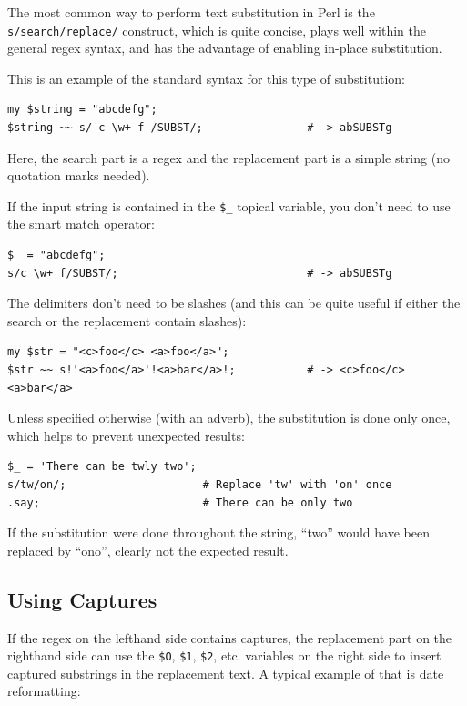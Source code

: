 The most common way to perform text substitution 
in Perl is the \verb's/search/replace/' construct, which 
is quite concise, plays well within the general regex syntax, 
and has the advantage of enabling in-place substitution.

This is an example of the standard syntax for this type 
of substitution:

\begin{verbatim}
my $string = "abcdefg";
$string ~~ s/ c \w+ f /SUBST/;                # -> abSUBSTg
\end{verbatim}

Here, the search part is a regex and the replacement 
part is a simple string (no quotation marks needed).

If the input string is contained in the \verb'$_' topical variable,
you don't  need to use the smart match operator:

\begin{verbatim}
$_ = "abcdefg";
s/c \w+ f/SUBST/;                             # -> abSUBSTg
\end{verbatim}
%

The delimiters don't need to be slashes (and this can be quite 
useful if either the search or the replacement contain slashes):

\begin{verbatim}
my $str = "<c>foo</c> <a>foo</a>";
$str ~~ s!'<a>foo</a>'!<a>bar</a>!;           # -> <c>foo</c> <a>bar</a>
\end{verbatim}
%

Unless specified otherwise (with an adverb), the substitution 
is done only once, which helps to prevent unexpected results:

\begin{verbatim}
$_ = 'There can be twly two';
s/tw/on/;                     # Replace 'tw' with 'on' once
.say;                         # There can be only two
\end{verbatim}
%
If the substitution were done throughout the string, ``two'' 
would have been replaced by ``ono'', clearly not the expected 
result.

\subsection{Using Captures}

If the regex on the lefthand side contains captures, the 
replacement part on the righthand side can use the \verb'$O', 
\verb'$1', \verb|$2|, etc. variables on the right side to insert 
captured substrings in the replacement text. A typical 
example of that is date reformatting:

